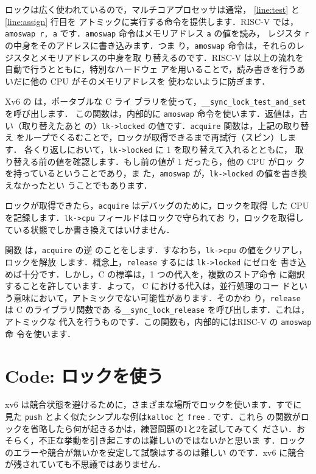 ロックは広く使われているので，マルチコアプロセッサは通常，
\ref{line:test} と \ref{line:assign} 行目を
アトミックに実行する命令を提供します．RISC-V では，
\lstinline{amoswap r, a} 
です．\lstinline{amoswap} 命令はメモリアドレス \texttt{a} の値を読み，
レジスタ \texttt{r} の中身をそのアドレスに書き込みます．つま
り，\lstinline{amoswap} 命令は，それらのレジスタとメモリアドレスの中身を取
り替えるのです．RISC-V は以上の流れを自動で行うとともに，特別なハードウェ
アを用いることで，読み書きを行うあいだに他の CPU がそのメモリアドレスを
使わないように防ぎます．

Xv6 の 
は，ポータブルな C ライ
ブラリを使って，\lstinline{__sync_lock_test_and_set} を呼び出します．
この関数は，内部的に \lstinline{amoswap} 命令を使います．返値は，古い（取り替えたあと
の）\lstinline{lk->locked} の値です．\lstinline{acquire} 関数は，上記の取り替え
をループでくるむことで，ロックが取得できるまで再試行（スピン）します．
各くり返しにおいて，\lstinline{lk->locked} に 1 を取り替えて入れるとともに，
取り替える前の値を確認します．もし前の値が 1 だったら，他の CPU がロッ
クを持っているということであり，ま
た，\lstinline{amoswap} が，\lstinline{lk->locked} の値を書き換えなかったとい
うことでもあります．

ロックが取得できたら，\lstinline{acquire} はデバッグのために，ロックを取得
した CPU を記録します．\lstinline{lk->cpu} フィールドはロックで守られてお
り，ロックを取得している状態でしか書き換えてはいけません．

 関数
は，\lstinline{acquire} の逆
のことをします．すなわち，\lstinline{lk->cpu} の値をクリアし，ロックを解放
します．概念上，\lstinline{release} するには \lstinline{lk->locked} にゼロを
書き込めば十分です．しかし，C の標準は，1 つの代入を，複数のストア命令
に翻訳することを許しています．よって， C における代入は，並行処理のコー
ドという意味において，アトミックでない可能性があります．そのかわ
り，\lstinline{release} は C のライブラリ関数であ
る\lstinline{__sync_lock_release} を呼び出します．これは，アトミックな
代入を行うものです．この関数も，内部的にはRISC-V の \lstinline{amoswap} 命
令を使います．

\section{Code: ロックを使う}
xv6 は競合状態を避けるために，さまざまな場所でロックを使います．すでに
見た \lstinline{push} とよく似たシンプルな例は\lstinline{kalloc}
と \lstinline{free}
.
です．これら
の関数がロックを省略したら何が起きるかは，練習問題の1と2を試してみてく
ださい．おそらく，不正な挙動を引き起こすのは難しいのではないかと思いま
す．ロックのエラーや競合が無いかを安定して試験はするのは難しい
のです．xv6 に競合が残されていても不思議ではありません．

